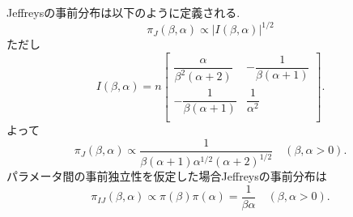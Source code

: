 \documentclass[titlepage,twoside]{jarticle}
\theoremstyle{definition}
\begin{document}
Jeffreysの事前分布は以下のように定義される.
$$
\pi_{J}(\beta, \alpha)
\propto
|I(\beta ,\alpha )|^{1/2}
$$
ただし
$$
I(\beta ,\alpha ) = n
\begin{bmatrix}
\dfrac{\alpha}{\beta ^{2}(\alpha +2)} & -\dfrac{1}{\beta (\alpha +1)}\\
-\dfrac{1}{\beta (\alpha +1)} & \dfrac{1}{\alpha ^{2}} \\
\end{bmatrix}.
$$
よって
\begin{equation}\label{Jeffreys prior}
\pi_{J}(\beta ,\alpha )
\propto
\frac{1}{\beta (\alpha +1)\alpha ^{1/2}(\alpha +2)^{1/2}}\quad (\beta,\alpha >0).
\end{equation}
パラメータ間の事前独立性を仮定した場合Jeffreysの事前分布は
\begin{equation}\label{independent prior}
\pi_{IJ}(\beta ,\alpha )
\propto 
\pi (\beta )\pi (\alpha )
=
\frac{1}{\beta \alpha }\quad (\beta ,\alpha >0).
\end{equation}
\end{document}
